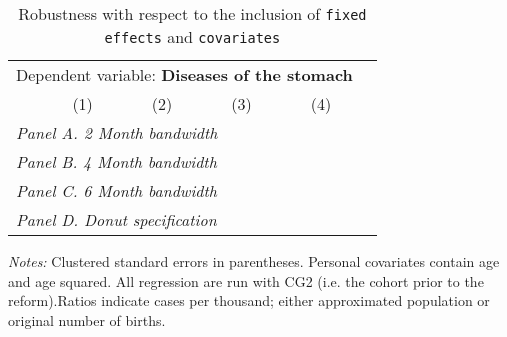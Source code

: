  \begin{table}[H] \begin{threeparttable} \centering \caption{Robustness with respect to the inclusion of \texttt{fixed effects} and \texttt{covariates}} {\def\sym#1{\ifmmode^{#1}\else\(^{#1}\)\fi} \begin{tabular}{l*{5}{c}} \toprule \multicolumn{5}{c}{Dependent variable: \textbf{Diseases of the stomach}} \\ \cmidrule(lr){2-5}
            &\multicolumn{1}{c}{(1)}&\multicolumn{1}{c}{(2)}&\multicolumn{1}{c}{(3)}&\multicolumn{1}{c}{(4)}\\
\midrule
 \multicolumn{5}{l}{\emph{Panel A. 2 Month bandwidth}} \\    \midrule\multicolumn{5}{l}{\emph{Panel B. 4 Month bandwidth}} \\    \midrule\multicolumn{5}{l}{\emph{Panel C. 6 Month bandwidth}} \\    \midrule\multicolumn{5}{l}{\emph{Panel D. Donut specification}} \\    \midrule  
\bottomrule \end{tabular} } \begin{tablenotes} \item \scriptsize \emph{Notes:} Clustered standard errors in parentheses. Personal covariates contain age and age squared. All regression are run with CG2 (i.e. the cohort prior to the reform).Ratios indicate cases per thousand; either approximated population or original number of births. \end{tablenotes} \end{threeparttable} \end{table} 
